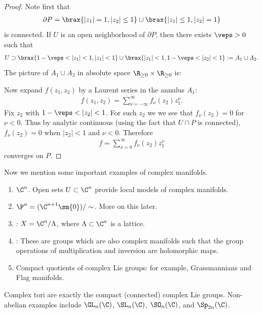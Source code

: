 \documentclass[11pt]{report}
\begin{document}
\begin{proof}
Note first that 
\begin{align*}
\partial P = \brax{|z_1|=1,|z_2| \le 1} \cup \brax{|z_1| \leq 1,|z_2|=1}
\end{align*}
is connected. If $U$ is an open neighborhood of $\partial P$, then there exists $\veps >0$ such that
\begin{align*}
U \supset \brax{1 - \veps < |z_1| < 1, |z_1|<1}\cup \brax{|z_1|<1, 1-\veps < |z_2| < 1}:= A_1 \cup A_2.
\end{align*}
The picture of $A_1 \cup A_2$ in absolute space $\R_{\ge 0}\times \R_{\ge 0}$ is:


Now expand $f(z_1,z_2)$ by a Laurent series in the annulus $A_1$:
\begin{align*}
f(z_1,z_2) = \sum_{\nu = -\infty}^\infty f_\nu(z_2)z_1^\nu.
\end{align*}
Fix $z_2$ with $1-\veps < |z_2| < 1$. For such $z_2$ we we see that $f_\nu(z_2) =0$ for $\nu < 0$. Thus by analytic continuous (using the fact that $U \cap P$ is connected), $f_\nu (z_2)=0$ when $|z_2|<1$ and $\nu <0$. Therefore \begin{align*}
f = \sum_{\nu = 0}^\infty f_\nu(z_2)z_1^\nu
\end{align*}
converges on $P$.
\end{proof}

\begin{ex}
Now we mention some important examples of complex manifolds.
\begin{enumerate}
    \item {} $\C^n$.  Open sets $U \subset \C^n$ provide local models of complex manifolds.
    \item {} $\P^n=(\C^{n+1}\sm \{0\})/ \sim$. More on this later.
    \item {}: $X = \C^n /\Lambda$, where $\Lambda \subset \C^n$ is a lattice.
    \item {}: These are groups which are also complex manifolds such that the group operations of multiplication and inversion are holomorphic maps.
    \item Compact quotients of complex Lie groups: for example, Grassmannians and Flag manifolds.
\end{enumerate}
\end{ex}

\begin{rmk}
Complex tori are exactly the compact (connected) complex Lie groups. Non-abelian examples include $\GL_n(\C)$, $\SL_n(\C)$, $\SO _n(\C)$, and $\Sp_{2n}(\C)$.
\end{rmk}
\end{document}
